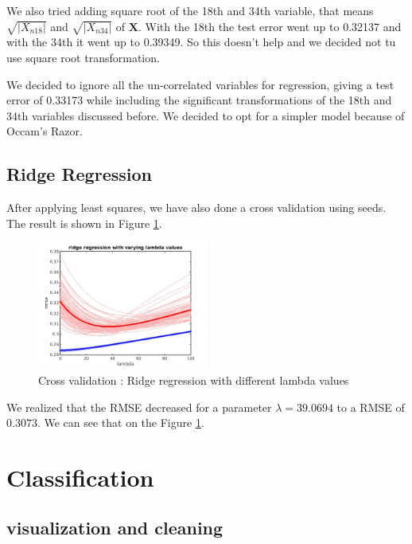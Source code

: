 \documentclass{article} %
\begin{document}
We also tried adding square root of the 18th and 34th variable, that means $\sqrt{|X_{n18}|}$ and $\sqrt{|X_{n34}|}$ of $\mathbf{X}$. With the 18th the test error went up to 0.32137 and with the 34th it went up to 0.39349. So this doesn't help and we decided not tu use square root transformation.

We decided to ignore all the un-correlated variables for regression, giving a test error of 0.33173 while including the significant transformations of the 18th and 34th variables discussed before. We decided to opt for a simpler model because of Occam’s Razor.


\subsection{Ridge Regression}
After applying least squares, we have also done a cross validation using seeds. The result is shown in Figure \ref{fig:ridreggcv}.
\begin{figure}
\centering
\includegraphics[width=0.5\textwidth]{images/ridgeRegCV.jpg}
\caption{Cross validation : Ridge regression with different lambda values }
\label{fig:ridreggcv}
\end{figure}
We realized that the RMSE decreased for a parameter $\lambda = 39.0694$ to a RMSE of $0.3073$. We can see that on the Figure \ref{fig:ridreggcv}.
\section{Classification}
\subsection{visualization and cleaning}
\end{document}
